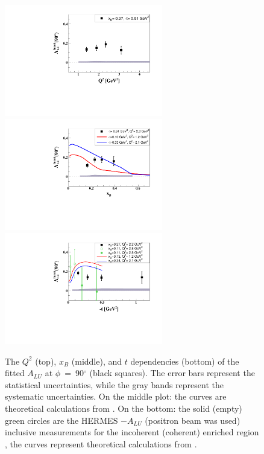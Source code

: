 \documentclass[twocolumn,nofootinbib,showpacs,prl,superscriptaddress,secnumarabic,amssymb,nobibnotes,aps,floatfix]{revtex4}
\begin{document}
\begin{figure}[tb]
\includegraphics[width=6.9cm]{figs/ALU_90_p_vs_Q2_shortscenrario.pdf}
\includegraphics[width=6.9cm]{figs/ALU_90_p_vs_x_shortscenrario.pdf}
\includegraphics[width=6.9cm]{figs/ALU_90_p_vs_t_shortscenrario.pdf}
\caption{The $Q^{2}$ (top), $x_{B}$ (middle), and $t$ dependencies (bottom) of
   the fitted $A_{LU}$ at $\phi$~=~90$^{\circ}$ (black squares). The error bars 
   represent the statistical uncertainties, while the gray bands represent the 
   systematic uncertainties. On the middle plot: the curves are theoretical 
   calculations from \cite{simonetta_2}. On the bottom: the solid (empty) green 
   circles are the HERMES $-A_{LU}$ (positron beam was used) inclusive 
measurements for the incoherent (coherent) enriched region 
\cite{Airapetian:2009cga}, the curves represent theoretical calculations from 
\cite{simonetta_2}.  } \label{fig:alu90}
\end{figure}
\end{document}
